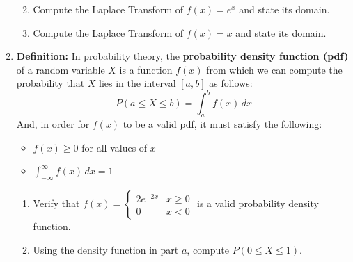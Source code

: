 \documentclass[12pt]{article}
\newif\ifans
\begin{document}
\begin{enumerate}
\begin{enumerate}
\ifans{\fbox{$\mathcal{L}\left\{1\right\}(s)=\frac{1}{s}$ for $s >0$}} \fi

\item Compute the Laplace Transform of $f(x)=e^x$ and state its domain.

\ifans{\fbox{$\mathcal{L}\left\{e^x\right\}(s)=\frac{1}{1-s}$ for $s >1$}} \fi

\item Compute the Laplace Transform of $f(x)=x$ and state its domain.

\ifans{\fbox{$\mathcal{L}\left\{x\right\}(s)=\frac{1}{s^2}$ for $s >0$}} \fi

\end{enumerate}

\item {\bf Definition:} In probability theory, the {\bf probability density function (pdf)} of a random variable $X$ is a function $f(x)$ from which we can compute the probability that $X$ lies in the interval $[a,b]$ as follows: $$P(a\leq X \leq b)=\int_a^b f(x) \,dx$$  And, in order for $f(x)$ to be a valid pdf, it must satisfy the following:

\begin{itemize}

\item $f(x) \geq 0$ for all values of $x$

\item $\int_{-\infty}^{\infty} f(x) \,dx=1$

\end{itemize}

\begin{enumerate}

\item Verify that $f(x)=\left\{\begin{array}{ll}
2e^{-2x} & x \geq 0\\
0 & x <0
\end{array}\right.$ is a valid probability density function.

\ifans{\fbox{\parbox{1\linewidth}{Notice that $f(x) > 0$ for all $x\geq 0$ because $e^{-2x}>0$; and $f(x)=0$ for $x<0$.  Thus, $f(x) \geq 0$ for all $x$.  Also, $$\int_{-\infty}^{\infty}f(x) \,dx=\int_0^{\infty}2e^{-2x} \,dx =1$$  Thus, $f(x)$ is a valid pdf.}}} \fi

\item Using the density function in part $a$, compute $P(0 \leq X \leq 1)$.

\ifans{\fbox{$\int_0^{1}2e^{-2x} \,dx=1-\frac{1}{e^2}$}} \fi


\end{enumerate}
\end{enumerate}
\end{document}
